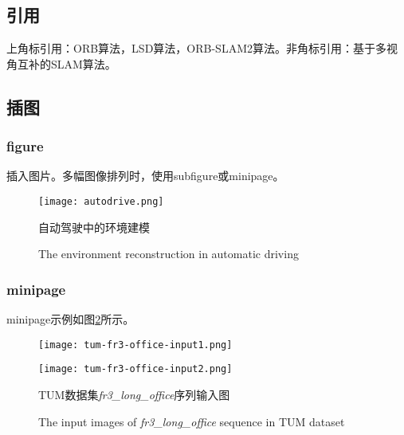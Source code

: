 \subsection{引用}

上角标引用：ORB算法\cite{ORB}，LSD算法，ORB-SLAM2\cite{ORB-SLAM2}算法。非角标引用：基于多视角互补的SLAM算法。

\subsection{插图}

\subsubsection{figure}

插入图片。多幅图像排列时，使用subfigure或minipage。
\begin{figure}[htb]
	\centering
	\texttt{[image: autodrive.png]}
	\caption{自动驾驶中的环境建模\protect\footnotemark[1]}
	\label{fig:introduction:autodrive}
	\addtocounter{figure}{-1}
	\renewcommand{\figurename}{Fig.}
	\caption{The environment reconstruction in automatic driving}
\end{figure}

\subsubsection{minipage}
minipage示例如图\ref{fig:line_optim:input}所示。

\begin{figure}[htb]
	\centering
	\begin{minipage}[t]{0.45\textwidth}
		\centering
		\texttt{[image: tum-fr3-office-input1.png]}
		\label{fig:line_optim:input1}
	\end{minipage}
	\vspace{0.1in} %
	\begin{minipage}[t]{0.45\textwidth}
		\centering
		\texttt{[image: tum-fr3-office-input2.png]}
		\label{fig:line_optim:input2}
	\end{minipage}
	\vspace{0.1in}
	\caption{TUM数据集{\itshape fr3\_long\_office}序列输入图}
	\label{fig:line_optim:input}
	\addtocounter{figure}{-1} %
	\renewcommand{\figurename}{Fig.}
	\caption{The input images of {\itshape fr3\_long\_office} sequence in TUM dataset}
\end{figure}

